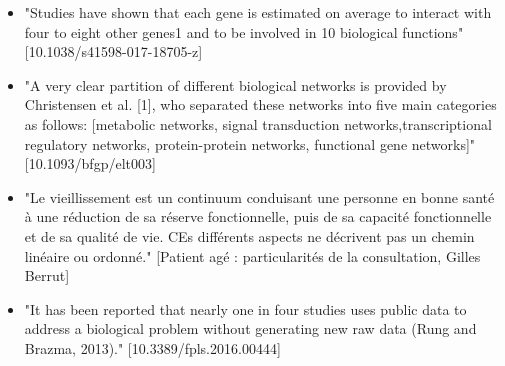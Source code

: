 \begin{itemize}
\item "Studies have shown that each gene is estimated on average to interact with four to eight other genes1 and to be involved in 10 biological functions" [10.1038/s41598-017-18705-z]
\item "A very clear partition of different biological networks is provided by Christensen et al. [1], who separated these networks into five main categories as follows: [metabolic networks, signal transduction networks,transcriptional regulatory networks, protein-protein networks, functional gene networks]" [10.1093/bfgp/elt003]
\item "Le vieillissement est un continuum conduisant une personne en bonne santé à une réduction de sa réserve fonctionnelle, puis de sa capacité fonctionnelle et de sa qualité de vie. CEs différents aspects ne décrivent pas un chemin linéaire ou ordonné." [Patient agé : particularités de la consultation, Gilles Berrut]
\item "It has been reported that nearly one in four studies uses public data to address a biological problem without generating new raw data (Rung and Brazma, 2013)." [10.3389/fpls.2016.00444]
\end{itemize}











